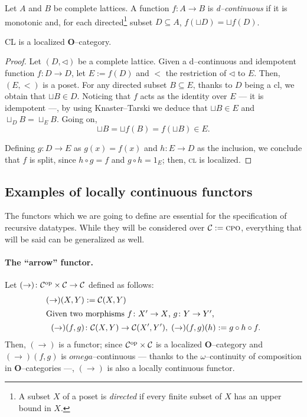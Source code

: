 \begin{dfn}
  Let \(A\) and \(B\) be complete lattices.
  A function \(f \colon A \to B\) is \emph{d--continuous} %
 if it is monotonic and, for each directed\footnote{A subset \(X\) of a poset is \emph{directed} if every finite subset of \(X\) has an upper bound in \(X\).} subset \(D \subseteq A\),
 \(f(\sqcup D) = \sqcup f(D)\).
\end{dfn}

\begin{prp}
  \textsc{CL} is a localized \(\mathbf{O}\)--category.
\end{prp}
\begin{proof}
  Let \((D, \lhd)\) be a complete lattice.
  Given a d--continuous and idempotent function \(f \colon D \to D\), let \(E := f(D)\) and \(<\) the restriction of \(\lhd\) to \(E\). %
  Then, \((E,<)\) is a poset. For any directed subset \(B \subseteq E\), thanks to \(D\) being a cl, we obtain that \(\sqcup B \in D\).
  Noticing that \(f\) acts as the identity over \(E\) --- it is idempotent ---, by using Knaster--Tarski we deduce that \(\sqcup B \in E\) and \(\sqcup_D B = \sqcup_E B\). %
  Going on,
  \begin{equation*}
    \sqcup B = \sqcup f(B) = f(\sqcup B) \in E.
  \end{equation*}

  Defining \(g \colon D \to E\) as \(g(x) = f(x)\) and \(h \colon E \to D\) as the inclusion, we conclude that \(f\) is split, since \(h \circ g = f\) and \(g \circ h = 1_E\); then, \textsc{cl} is localized.
\end{proof}

\subsection{Examples of locally continuous functors}

The functors which we are going to define are essential for the specification of recursive datatypes. While they will be considered over \(\mathcal{C} := \mathrm{\textsc{cpo}}\), everything that will be said can be generalized as well.

\paragraph{The ``arrow'' functor.}
Let \((\rightarrow) \colon \mathcal{C}^\textup{op} \times \mathcal{C} \to \mathcal{C}\) defined as follows:
\begin{align*}
    (\rightarrow)(X,Y) &:= \mathcal{C}(X,Y) \\
    \intertext{Given two morphisms \(f \colon X' \to X\), \(g \colon Y \to Y'\),}
    (\rightarrow)(f,g) &\colon
      \mathcal{C}(X,Y) \to \mathcal{C}(X',Y'), \;
      (\rightarrow)(f,g)(h) := g \circ h \circ f.
\end{align*}
Then, \((\rightarrow)\) is a functor; since \(\mathcal{C}^\textup{op} \times \mathcal{C}\) is a localized \(\mathbf{O}\)--category and \((\rightarrow)(f,g)\) is \(omega\)--continuous --- thanks to the \(\omega\)--continuity of composition in \(\mathbf{O}\)--categories ---, \((\rightarrow)\) is also a locally continuous functor. %

